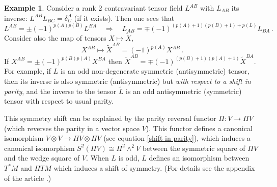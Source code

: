 \documentclass[12pt,reqno,a4paper]{amsart}
\theoremstyle{definition}
\newtheorem{example}{Example}[section]
\begin{document}
\begin{example}\label{mistery}
Consider a rank $2$ contravariant tensor field $L^{AB}$ with $L_{AB}$ its
inverse: $L^{AB}L_{BC} = \delta^A_C$ (if it exists).
Then one sees that
    \begin{equation}\label{inverses}
    L^{AB} = \pm(-1)^{p(A)p(B)}L^{BA}\quad\Rightarrow\quad L_{AB} =
\mp(-1)^{(p(A)+1)(p(B)+1)+p(L)}L_{BA}\,.
    \end{equation}
Consider also the map
 of tensors $X\mapsto \tilde{X}$,
    \begin{equation}\label{shift in parity}
    X^{AB}\mapsto \tilde{X}^{AB} = (-1)^{p(A)}X^{AB}\,.
        \end{equation}
If $X^{AB}=\pm (-1)^{p(B)p(A)}X^{BA}$ then
  $\tilde{X}^{AB}=\mp (-1)^{(p(B)+1)(p(A)+1)}\tilde{X}^{BA}$.
For example, if $L$ is an odd non-degenerate
symmetric (antisymmetric) tensor,
then its inverse is also symmetric (antisymmetric) but
\emph{with respect to a shift in parity}, and the inverse
to the tensor $\tilde{L}$ is an odd antisymmetric (symmetric)
tensor with respect to usual parity.
   \end{example}
This symmetry shift can be explained by the parity reversal functor
  $\Pi:V\rightarrow \Pi V$
 (which reverses the parity in a vector space $V$).
 This functor defines a
canonical isomorphism $V\otimes V\to\Pi V\otimes\Pi V$
(see equation \eqref{shift in parity}), which
induces a canonical isomorphism $S^2(\Pi V)\cong\Pi^2\wedge^2 V$
between the symmetric square of $\Pi V$ and the wedge square
of $V$. When $L$ is odd, $L$ defines an isomorphism between
$T^*M$ and $\Pi TM$ which induces a shift of symmetry.
 (For details see the appendix of the article \cite{Vorvolume1}.)
\end{document}
